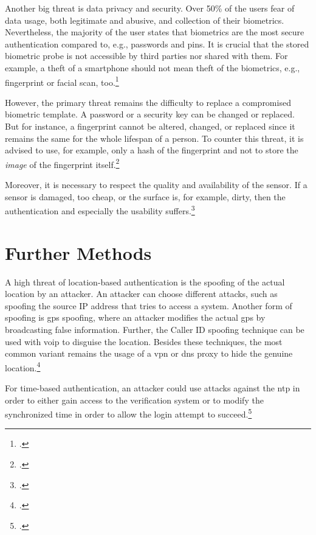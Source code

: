 Another big threat is data privacy and security. Over 50\% of the users fear of data usage, both legitimate and abusive, and collection of their biometrics. Nevertheless, the majority of the user states that biometrics are the most secure authentication compared to, e.g., passwords and \glspl{pin}. It is crucial that the stored biometric probe is not accessible by third parties nor shared with them. For example, a theft of a smartphone should not mean theft of the biometrics, e.g., fingerprint or facial scan, too.\footcites[See][8]{ibm-security}

However, the primary threat remains the difficulty to replace a compromised biometric template. A password or a security key can be changed or replaced. But for instance, a fingerprint cannot be altered, changed, or replaced since it remains the same for the whole lifespan of a person. To counter this threat, it is advised to use, for example, only a hash of the fingerprint and not to store the \textit{image} of the fingerprint itself.\footcites[See][266]{shostack2014threat}

Moreover, it is necessary to respect the quality and availability of the sensor. If a sensor is damaged, too cheap, or the surface is, for example, dirty, then the authentication and especially the usability suffers.\footcites[See][37]{265831}

\section{Further Methods}

A high threat of location-based authentication is the spoofing of the actual location by an attacker. An attacker can choose different attacks, such as spoofing the source IP address that tries to access a system. Another form of spoofing is \gls{gps} spoofing, where an attacker modifies the actual \gls{gps} by broadcasting false information. Further, the Caller ID spoofing technique can be used with \gls{voip} to disguise the location. Besides these techniques, the most common variant remains the usage of a \gls{vpn} or \gls{dns} proxy to hide the genuine location.\footcites[See][138--145]{517355}[See][Chapter 4.5.3]{30270}[See][115--116,133]{eckert-it-sec-9}

For time-based authentication, an attacker could use attacks against the \gls{ntp} in order to either gain access to the verification system or to modify the synchronized time in order to allow the login attempt to succeed.\footcite[See][]{malhotraattacking}
